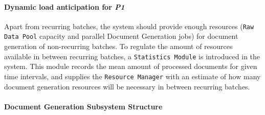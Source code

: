 \documentclass[a4paper,10pt]{article}
\begin{document}
\paragraph{Dynamic load anticipation for \emph{P1}}
Apart from recurring batches, the system should provide enough resources (\texttt{Raw Data Pool} capacity and parallel Document Generation jobs) for document generation of non-recurring batches. To regulate the amount of resources available in between recurring batches, a \texttt{Statistics Module} is introduced in the system. This module records the mean amount of processed documents for given time intervals, and supplies the \texttt{Resource Manager} with an estimate of how many document generation resources will be necessary in between recurring batches.

\paragraph{Document Generation Subsystem Structure}
\end{document}
